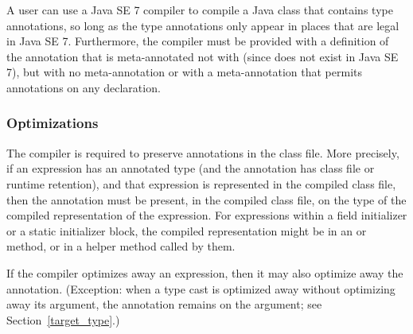 \documentclass[10pt]{article}
\begin{document}
A user can use a Java SE 7 compiler to compile a Java class that contains
type annotations, so long as the type annotations only appear in places
that are legal in Java SE 7.  Furthermore, the compiler must be provided
with a definition of the annotation that is meta-annotated not with
 (since 
does not exist in Java SE 7), but with no meta-annotation or with a
meta-annotation that permits annotations on any declaration.


\subsubsection{Optimizations\label{mods-optimization}}


The compiler is required to preserve annotations in the class file.  More
precisely, if an expression has an annotated type (and the annotation has
class file or runtime retention), and that expression is represented
in the compiled class file, then the annotation must be present, in the
compiled class file, on the type of the compiled representation of the
expression.  For expressions within a field initializer or a static
initializer block, the compiled representation might be in an 
or  method, or in a helper method called by them.

If the compiler optimizes away an expression, then it may also
optimize away the annotation.  (Exception:  when a type cast
is optimized away without optimizing away its argument, the
annotation remains on the argument; see Section~\ref{target_type}.)
\end{document}
